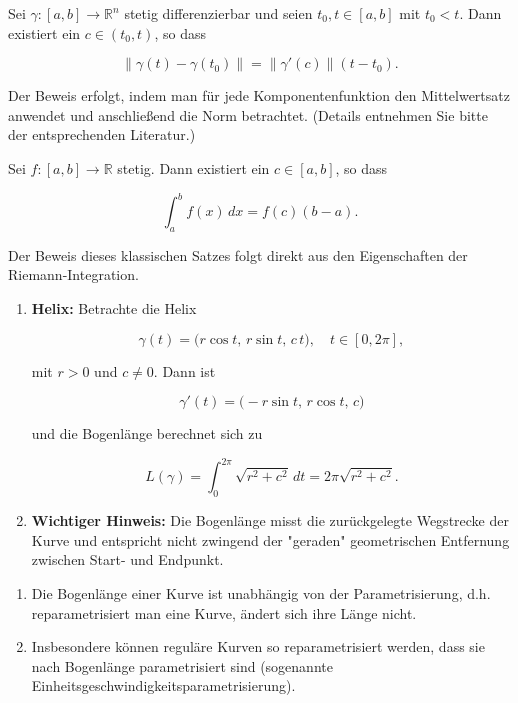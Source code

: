 \begin{lemma}{}
Sei $\gamma: [a,b] \to \mathbb{R}^n$ stetig differenzierbar und seien $t_0,t\in[a,b]$ mit $t_0<t$. Dann existiert ein $c\in (t_0,t)$, so dass


$$
\|\gamma(t)-\gamma(t_0)\|=\|\gamma'(c)\|(t-t_0).
$$


\end{lemma}

\begin{beweisbox}
Der Beweis erfolgt, indem man für jede Komponentenfunktion den Mittelwertsatz anwendet und anschließend die Norm betrachtet. (Details entnehmen Sie bitte der entsprechenden Literatur.)
\end{beweisbox}

\begin{lemma}{}
Sei $f: [a,b] \to \mathbb{R}$ stetig. Dann existiert ein $c\in [a,b]$, so dass


$$
\int_a^b f(x)\,dx = f(c)(b-a).
$$


\end{lemma}

\begin{beweisbox}
Der Beweis dieses klassischen Satzes folgt direkt aus den Eigenschaften der Riemann-Integration.
\end{beweisbox}

\begin{beispielbox}
\begin{enumerate}
  \item \textbf{Helix:} Betrachte die Helix
  

$$
  \gamma(t)=\bigl( r\cos t,\, r\sin t,\, c\,t \bigr),\quad t\in[0,2\pi],
  $$


  mit $r>0$ und $c\neq0$. Dann ist
  

$$
  \gamma'(t)=\bigl( -r\sin t,\, r\cos t,\, c \bigr)
  $$


  und die Bogenlänge berechnet sich zu
  

$$
  L(\gamma)=\int_0^{2\pi}\sqrt{r^2+c^2}\,dt=2\pi\sqrt{r^2+c^2}.
  $$


  
  \item \textbf{Wichtiger Hinweis:} Die Bogenlänge misst die zurückgelegte Wegstrecke der Kurve und entspricht nicht zwingend der "geraden" geometrischen Entfernung zwischen Start- und Endpunkt.
\end{enumerate}
\end{beispielbox}

\begin{bemerkungbox}
\begin{enumerate}
  \item Die Bogenlänge einer Kurve ist unabhängig von der Parametrisierung, d.h. reparametrisiert man eine Kurve, ändert sich ihre Länge nicht.
  \item Insbesondere können reguläre Kurven so reparametrisiert werden, dass sie nach Bogenlänge parametrisiert sind (sogenannte Einheitsgeschwindigkeitsparametrisierung).
\end{enumerate}
\end{bemerkungbox}
